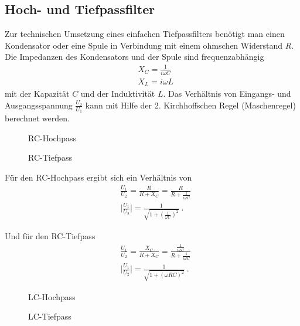 \subsection{Hoch- und Tiefpassfilter}
Zur technischen Umsetzung eines einfachen Tiefpassfilters benötigt man einen Kondensator oder eine Spule in Verbindung mit einem ohmschen Widerstand $R$.
Die Impedanzen des Kondensators und der Spule sind frequenzabhängig
\begin{align}
&X_C = \frac{1}{i \omega C} \\
&X_L = i \omega L
\end{align}
mit der Kapazität $C$ und der Induktivität $L$.
Das Verhältnis von Eingangs- und Ausgangsspannung $\frac{U_2}{U_1}$ kann mit Hilfe der 2. Kirchhoffschen Regel (Maschenregel) berechnet werden.


\begin{figure}[h!]
	\centering
	\begin{minipage}{0.4\textwidth}
		
		\caption{RC-Hochpass}
	\end{minipage}
	\hspace{1cm}
	\begin{minipage}{0.4\textwidth}
		
		\caption{RC-Tiefpass}
		\label{RC-Tiefpass}
	\end{minipage}
\end{figure}		


Für den RC-Hochpass ergibt sich ein Verhältnis von
\begin{align}
&\frac{U_1}{U_2} = \frac{R}{R + X_C} = \frac{R}{R+\frac{1}{i \omega C}} \\
& \bigr| \frac{U_1}{U_2} \bigl| = \frac{1}{\sqrt{1 + \left(\frac{1}{\omega C}\right)^2}}\ .
\end{align}

Und für den RC-Tiefpass
\begin{align}
&\frac{U_1}{U_2} = \frac{X_C}{R + X_C} = \frac{\frac{1}{i \omega C}}{R+\frac{1}{i \omega C}} \\
& \bigr| \frac{U_1}{U_2} \bigl| = \frac{1}{\sqrt{1 + (\omega R C)^2}} \ .
\end{align}


\begin{figure}[h!]
	\centering
	\begin{minipage}{0.4\textwidth}
		
		\caption{LC-Hochpass}
	\end{minipage}
	\hspace{1cm}
	\begin{minipage}{0.4\textwidth}
		
		\caption{LC-Tiefpass}
	\end{minipage}
\end{figure}		



